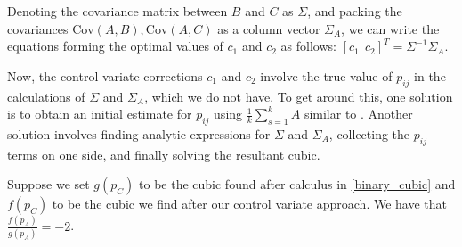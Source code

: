 \documentclass[runningheads]{llncs}
\newcommand{\cov}{\text{Cov}}
\begin{document}
Denoting the covariance matrix between $B$ and $C$ as $\Sigma$, and packing the covariances $\cov(A,B), \cov(A,C)$ as a column vector $\Sigma_{A}$, we can write the equations forming the optimal values of $c_1$ and $c_2$ as follows: $[c_1~~c_2]^T = \Sigma^{-1} \Sigma_{A}$.
        
Now, the control variate corrections $c_1$ and $c_2$ involve the true value of $p_{ij}$ in the calculations of $\Sigma$ and $\Sigma_A$, which we do not have. To get around this, one solution is to obtain an initial estimate for $p_{ij}$ using $\frac{1}{k}\sum_{s=1}^k{A}$ similar to \cite{Kang2021-correlations}. Another solution involves finding analytic expressions for $\Sigma$ and $\Sigma_A$, collecting the $p_{ij}$ terms on one side, and finally solving the resultant cubic.
        
\begin{theorem}
Suppose we set $g(p_C)$ to be the cubic found after calculus in \eqref{binary_cubic} and $f(p_C)$ to be the cubic we find after our control variate approach. We have that $\frac{f(p_A)}{g(p_A)} = -2$.
\end{theorem}
\end{document}
